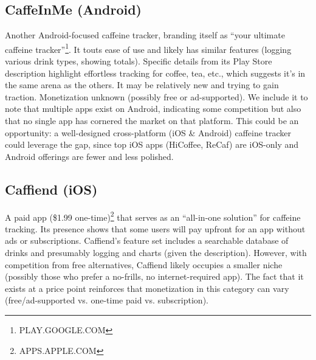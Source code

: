 \documentclass{article}
\begin{document}
\subsection{CaffeInMe (Android)}
Another Android-focused caffeine tracker, branding itself as “your ultimate caffeine tracker”\footnote{PLAY.GOOGLE.COM}. It touts ease of use and likely has similar features (logging various drink types, showing totals). Specific details from its Play Store description highlight effortless tracking for coffee, tea, etc., which suggests it’s in the same arena as the others. It may be relatively new and trying to gain traction. Monetization unknown (possibly free or ad-supported). We include it to note that multiple apps exist on Android, indicating some competition but also that no single app has cornered the market on that platform. This could be an opportunity: a well-designed cross-platform (iOS \& Android) caffeine tracker could leverage the gap, since top iOS apps (HiCoffee, ReCaf) are iOS-only and Android offerings are fewer and less polished.

\subsection{Caffiend (iOS)}
A paid app (\$1.99 one-time)\footnote{APPS.APPLE.COM} that serves as an “all-in-one solution” for caffeine tracking. Its presence shows that some users will pay upfront for an app without ads or subscriptions. Caffiend’s feature set includes a searchable database of drinks and presumably logging and charts (given the description). However, with competition from free alternatives, Caffiend likely occupies a smaller niche (possibly those who prefer a no-frills, no internet-required app). The fact that it exists at a price point reinforces that monetization in this category can vary (free/ad-supported vs. one-time paid vs. subscription).
\end{document}
